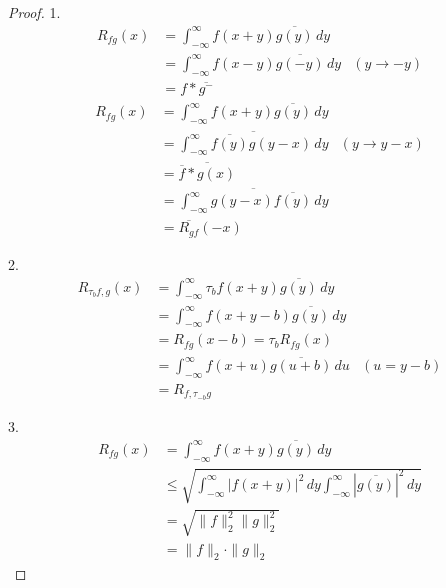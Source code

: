 \begin{proof}
    1.
    \begin{align*}
        R_{fg}(x) & =\int_{-\infty}^{\infty}f(x+y)\overline{g(y)}\,dy              \\
                  & =\int_{-\infty}^{\infty}f(x-y)\overline{g(-y)}\,dy & (y\to -y) \\
                  & =f*\overline{g^-}
    \end{align*}
    \begin{align*}
        R_{fg}(x) & =\int_{-\infty}^{\infty}f(x+y)\overline{g(y)}\,dy                         \\
                  & =\overline{\int_{-\infty}^{\infty}\overline{f(y)}g(y-x)\,dy} & (y\to y-x) \\
                  & =\overline{\overline{f}*g(x)}                                             \\
                  & =\overline{\int_{-\infty}^{\infty}g(y-x)\overline{f(y)}\,dy}              \\
                  & =\overline{R_{gf}}(-x)
    \end{align*}



    2.\begin{align*}
        R_{\tau_b f,g}(x) & =\int_{-\infty}^{\infty}\tau_b f(x+y)\overline{g(y)}\,dy           \\
                          & =\int_{-\infty}^{\infty}f(x+y-b)\overline{g(y)}\,dy                \\
                          & =R_{fg}(x-b)=\tau_{b} R_{fg}(x)                                    \\
                          & =\int_{-\infty}^{\infty}f(x+u)\overline{g(u+b)}\,du      & (u=y-b) \\
                          & =R_{f,\tau_{-b}g}
    \end{align*}

    3.\begin{align*}
        R_{fg}(x) & =\int_{-\infty}^{\infty}f(x+y)\overline{g(y)}\,dy                                                            \\
                  & \leq \sqrt{\int_{-\infty}^{\infty}|f(x+y)|^2\,dy\int_{-\infty}^{\infty}\left|\overline{g(y)}\right|^2\,dy  } \\
                  & =\sqrt{\|f\|_2^2\|g\|_2^2}                                                                                   \\
                  & =\|f\|_2\cdot\|g\|_2
    \end{align*}
\end{proof}


